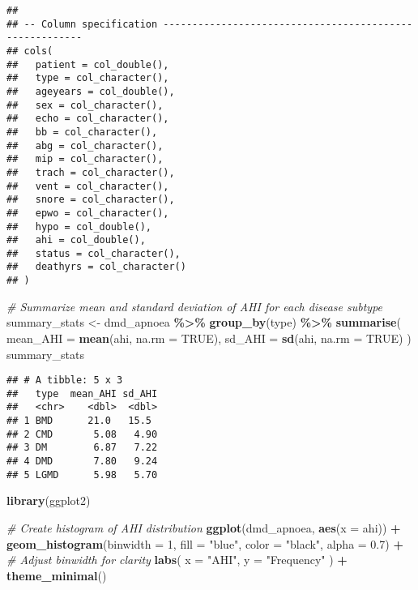 \documentclass[
]{article}
\newenvironment{Shaded}{\begin{snugshade}}{\end{snugshade}}
\newcommand{\AttributeTok}[1]{\textcolor[rgb]{0.13,0.29,0.53}{#1}}
\newcommand{\CommentTok}[1]{\textcolor[rgb]{0.56,0.35,0.01}{\textit{#1}}}
\newcommand{\ConstantTok}[1]{\textcolor[rgb]{0.56,0.35,0.01}{#1}}
\newcommand{\DecValTok}[1]{\textcolor[rgb]{0.00,0.00,0.81}{#1}}
\newcommand{\FloatTok}[1]{\textcolor[rgb]{0.00,0.00,0.81}{#1}}
\newcommand{\FunctionTok}[1]{\textcolor[rgb]{0.13,0.29,0.53}{\textbf{#1}}}
\newcommand{\NormalTok}[1]{#1}
\newcommand{\OtherTok}[1]{\textcolor[rgb]{0.56,0.35,0.01}{#1}}
\newcommand{\SpecialCharTok}[1]{\textcolor[rgb]{0.81,0.36,0.00}{\textbf{#1}}}
\newcommand{\StringTok}[1]{\textcolor[rgb]{0.31,0.60,0.02}{#1}}
\begin{document}
\begin{verbatim}
## 
## -- Column specification --------------------------------------------------------
## cols(
##   patient = col_double(),
##   type = col_character(),
##   ageyears = col_double(),
##   sex = col_character(),
##   echo = col_character(),
##   bb = col_character(),
##   abg = col_character(),
##   mip = col_character(),
##   trach = col_character(),
##   vent = col_character(),
##   snore = col_character(),
##   epwo = col_character(),
##   hypo = col_double(),
##   ahi = col_double(),
##   status = col_character(),
##   deathyrs = col_character()
## )
\end{verbatim}

\begin{Shaded}
\begin{Highlighting}[]
\CommentTok{\# Summarize mean and standard deviation of AHI for each disease subtype}
\NormalTok{summary\_stats }\OtherTok{\textless{}{-}}\NormalTok{ dmd\_apnoea }\SpecialCharTok{\%\textgreater{}\%}
  \FunctionTok{group\_by}\NormalTok{(type) }\SpecialCharTok{\%\textgreater{}\%}
  \FunctionTok{summarise}\NormalTok{(}
    \AttributeTok{mean\_AHI =} \FunctionTok{mean}\NormalTok{(ahi, }\AttributeTok{na.rm =} \ConstantTok{TRUE}\NormalTok{),}
    \AttributeTok{sd\_AHI =} \FunctionTok{sd}\NormalTok{(ahi, }\AttributeTok{na.rm =} \ConstantTok{TRUE}\NormalTok{)}
\NormalTok{  )}
\NormalTok{summary\_stats}
\end{Highlighting}
\end{Shaded}

\begin{verbatim}
## # A tibble: 5 x 3
##   type  mean_AHI sd_AHI
##   <chr>    <dbl>  <dbl>
## 1 BMD      21.0   15.5 
## 2 CMD       5.08   4.90
## 3 DM        6.87   7.22
## 4 DMD       7.80   9.24
## 5 LGMD      5.98   5.70
\end{verbatim}

\begin{Shaded}
\begin{Highlighting}[]
\FunctionTok{library}\NormalTok{(ggplot2)}

\CommentTok{\# Create histogram of AHI distribution}
\FunctionTok{ggplot}\NormalTok{(dmd\_apnoea, }\FunctionTok{aes}\NormalTok{(}\AttributeTok{x =}\NormalTok{ ahi)) }\SpecialCharTok{+}
  \FunctionTok{geom\_histogram}\NormalTok{(}\AttributeTok{binwidth =} \DecValTok{1}\NormalTok{, }\AttributeTok{fill =} \StringTok{"blue"}\NormalTok{, }\AttributeTok{color =} \StringTok{"black"}\NormalTok{, }\AttributeTok{alpha =} \FloatTok{0.7}\NormalTok{) }\SpecialCharTok{+}  \CommentTok{\# Adjust binwidth for clarity}
  \FunctionTok{labs}\NormalTok{(}
    \AttributeTok{x =} \StringTok{"AHI"}\NormalTok{,}
    \AttributeTok{y =} \StringTok{"Frequency"}
\NormalTok{  ) }\SpecialCharTok{+}
  \FunctionTok{theme\_minimal}\NormalTok{()}
\end{Highlighting}
\end{Shaded}
\end{document}
